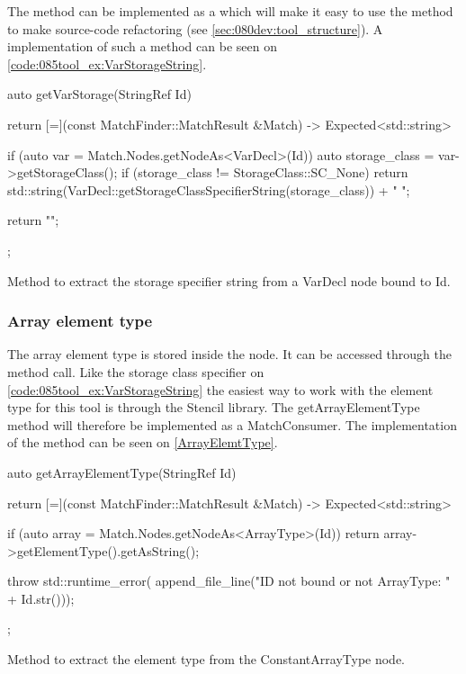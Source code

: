 The  method can be implemented as a  which will make it easy to use the method to make source-code refactoring (see \cref{sec:080dev:tool_structure}). A implementation of such a method can be seen on \cref{code:085tool_ex:VarStorageString}.

\begin{listing}[H]
    \begin{cppcode}
auto getVarStorage(StringRef Id) {
    return [=](const MatchFinder::MatchResult &Match) -> Expected<std::string> {
        if (auto var = Match.Nodes.getNodeAs<VarDecl>(Id)) {
            auto storage_class = var->getStorageClass();
            if (storage_class != StorageClass::SC_None) {
               return std::string(VarDecl::getStorageClassSpecifierString(storage_class)) + " ";
            }
        }

        return "";
    };
}
    \end{cppcode}
    \caption{Method to extract the storage specifier string from a VarDecl node bound to Id.}
    \label{code:085tool_ex:VarStorageString}
\end{listing}

\subsubsection*{Array element type}

The array element type is stored inside the  node. It can be accessed through the  method call. Like the storage class specifier on \cref{code:085tool_ex:VarStorageString} the easiest way to work with the element type for this tool is through the Stencil library. The getArrayElementType method will therefore be implemented as a MatchConsumer. The implementation of the method can be seen on \cref{ArrayElemtType}. 

\begin{listing}[H]
    \begin{cppcode}
auto getArrayElementType(StringRef Id) {
    return [=](const MatchFinder::MatchResult &Match) -> Expected<std::string> {
        if (auto array = Match.Nodes.getNodeAs<ArrayType>(Id)) {
            return array->getElementType().getAsString();
        }

        throw std::runtime_error(
			    append_file_line("ID not bound or not ArrayType: " + Id.str()));
    };
}
    \end{cppcode}
    \caption{Method to extract the element type from the ConstantArrayType node.}
    \label{code:085tool_ex:ArrayElemtType}
\end{listing}

